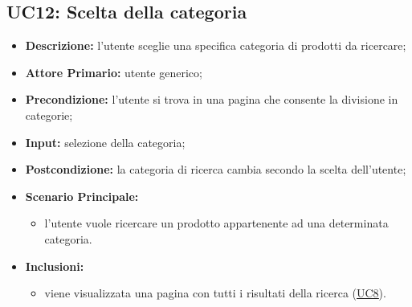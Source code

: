 \subsection{UC12: Scelta della categoria}
\label{sec:UC12}
\begin{itemize}
    \item \textbf{Descrizione:} l'utente sceglie una specifica categoria di prodotti da ricercare;
    \item \textbf{Attore Primario:} utente generico;
    \item \textbf{Precondizione:} l'utente si trova in una pagina che consente la divisione in categorie;
    \item \textbf{Input:} selezione della categoria;
    \item \textbf{Postcondizione:} la categoria di ricerca cambia secondo la scelta dell'utente;
    \item \textbf{Scenario Principale:}
          \begin{itemize}
              \item l'utente vuole ricercare un prodotto appartenente ad una determinata categoria.
          \end{itemize}
    \item \textbf{Inclusioni:}
          \begin{itemize}
              \item viene visualizzata una pagina con tutti i risultati della ricerca (\hyperref[sec:UC8]{\underline{UC8}}).
          \end{itemize}
\end{itemize}